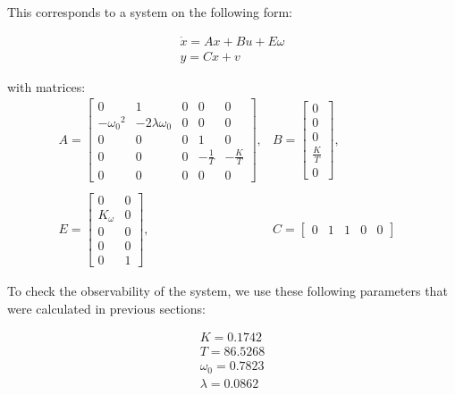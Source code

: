 This corresponds to a system on the following form:

\begin{equation}
   \begin{array}{l}
\dot x = Ax + Bu + E\omega \\
y = Cx + v
\end{array}
\end{equation}

with matrices:
\begin{equation*}\label{matrices}
   \begin{array}{cccc}
       A = \left[ {\begin{array}{*{20}{c}}
0&1&0&0&0\\
{ - {\omega _0}^2}&{ - 2\lambda {\omega _0}}&0&0&0\\
0&0&0&1&0\\
0&0&0&{ - \frac{1}{T}}&{ - \frac{K}{T}}\\
0&0&0&0&0
\end{array}} \right] ,&
       B = \left[ {\begin{array}{*{20}{c}}
0\\
0\\
0\\
{\frac{K}{T}}\\
0
\end{array}} \right] ,& \\\\
       E = \left[ {\begin{array}{*{20}{c}}
0&0\\
{{K_\omega }}&0\\
0&0\\
0&0\\
0&1
\end{array}} \right] ,&
       C = \left[ {\begin{array}{*{20}{c}}
0&1&1&0&0
\end{array}} \right]
   \end{array}
\end{equation*}

To check the observability of the system, we use these following parameters that were calculated in previous sections:

\begin{equation}
   \begin{array}{l}
K = 0.1742\\
T = 86.5268\\
{\omega _0} = 0.7823\\
\lambda  = 0.0862
\end{array}
\end{equation}


